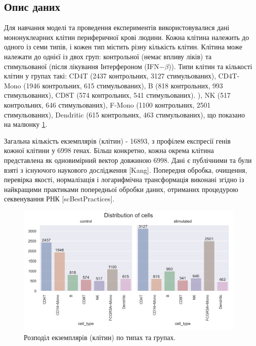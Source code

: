 \subsection{Опис даних}


{
Для навчання моделі та проведення експериментів використовувалися дані мононуклеарних клітин периферичної крові людини. 
Кожна клітина належить до одного із семи типів, і кожен тип містить різну кількість клітин. Клітина може належати до однієї із двох груп: контрольної (немає впливу ліків) та стимульованої (після лікування Інтерфероном (IFN$-\beta$)). Типи клітин та кількості клітин у групах такі: CD4T (2437 контрольних, 3127 стимульованих), CD4T-Mono (1946 контрольних, 615 стимульованих), B (818 контрольних, 993 стимульованих), CD8T (574 контрольних, 541 стимульованих). ), NK (517 контрольних, 646 стимульованих), F-Mono (1100 контрольних, 2501 стимульованих), Dendritic (615 контрольних, 463 стимульованих), що показано на малюнку \ref{figure-dataset-original}. 

Загальна кількість екземплярів (клітин) - 16893, з профілем експресії генів кожної клітини у 6998 генах. Більш конкретно, кожна окрема клітина представлена як одновимірний вектор довжиною 6998. Дані є публічними та були взяті з існуючого наукового дослідження [Kang]. Попередня обробка, очищення, перевірка якості, нормалізація і логарифмічна трансформація виконані згідно із найкращими практиками попередньої обробки даних, отриманих процедурою секвенування РНК [scBestPractices].


\begin{figure}[htbp]
    \centerline{\includegraphics[width=0.6\columnwidth]{pictures/original-dataset.png}}
    \caption{Розподіл екземплярів (клітин) по типах та групах.}
    \label{figure-dataset-original}
\end{figure}

\color{red}

}